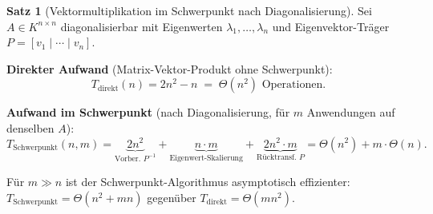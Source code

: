 ﻿\documentclass[a4paper,12pt]{report}
\theoremstyle{definition}
\newtheorem{satz}{Satz}
\begin{document}
\begin{satz}[Vektormultiplikation im Schwerpunkt nach Diagonalisierung]
    \label{satz:diag-schwerpunkt}
    Sei $A \in K^{n \times n}$ diagonalisierbar mit Eigenwerten
    $\lambda_1, \ldots, \lambda_n$ und Eigenvektor-Träger
    $P = [v_1 \mid \cdots \mid v_n]$.

    \textbf{Direkter Aufwand} (Matrix-Vektor-Produkt ohne Schwerpunkt):
    \[
        T_{\mathrm{direkt}}(n) = 2n^2 - n \;=\; \Theta(n^2) \text{ Operationen}.
    \]

    \textbf{Aufwand im Schwerpunkt} (nach Diagonalisierung,
    für $m$ Anwendungen auf denselben $A$):
    \[
        T_{\mathrm{Schwerpunkt}}(n, m)
        = \underbrace{2n^2}_{\text{Vorber. } P^{-1}}
        + \underbrace{n \cdot m}_{\text{Eigenwert-Skalierung}}
        + \underbrace{2n^2 \cdot m}_{\text{Rücktransf. } P}
        = \Theta(n^2) + m \cdot \Theta(n).
    \]

    Für $m \gg n$ ist der Schwerpunkt-Algorithmus asymptotisch
    effizienter: $T_{\mathrm{Schwerpunkt}} = \Theta(n^2 + mn)$
    gegenüber $T_{\mathrm{direkt}} = \Theta(mn^2)$.
\end{satz}
\end{document}
